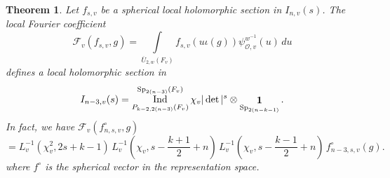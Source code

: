 \documentclass[11pt,notitlepage]{amsart}
\newtheorem{theorem}{Theorem}[section]
\theoremstyle{definition}
\theoremstyle{remark}
\newcommand{\calF}{\mathcal{F}}
\newcommand{\calO}{\mathcal{O}}
\DeclareMathOperator{\id}{{\bf 1}}
\DeclareMathOperator{\Sp}{Sp}
\DeclareMathOperator{\Ind}{Ind}
\begin{document}
\begin{theorem}\label{thm501}
  Let $f_{s,v}$ be a spherical local holomorphic section in $I_{n,v}(s)$. The local Fourier coefficient
  \begin{equation*}
    \calF_v(f_{s,v},g) = \int\limits_{\overline{U}_{2,w}(F_v)}f_{s,v}(u\iota(g))\psi^{w^{-1}}_{\calO,v}(u)\,du
  \end{equation*}
  defines a local holomorphic section in 
  \begin{equation*}
    I_{n-3,v}(s) = \Ind_{P_{k-2,2(n-3)}(F_v)}^{\Sp_{2(n-3)}(F_v)} \chi_v|\det|^{s}\otimes \id_{\Sp_{2(n-k-1)}}.
  \end{equation*}
  In fact, we have $
    \calF_v(f^{\circ}_{n,s,v},g) $
  \begin{equation*}=
    L_v^{-1}(\chi_v^2,2s+k-1)\,
    L_v^{-1}\!\left(\chi_v,s-\frac{k+1}{2}+n\right)\,
    L_v^{-1}\!\left(\chi_v,s-\frac{k-1}{2}+n\right)\,
    f^{\circ}_{n-3,s,v}(g).
  \end{equation*}
  where $f^\circ$ is the spherical vector in the representation space.
\end{theorem}
\end{document}
